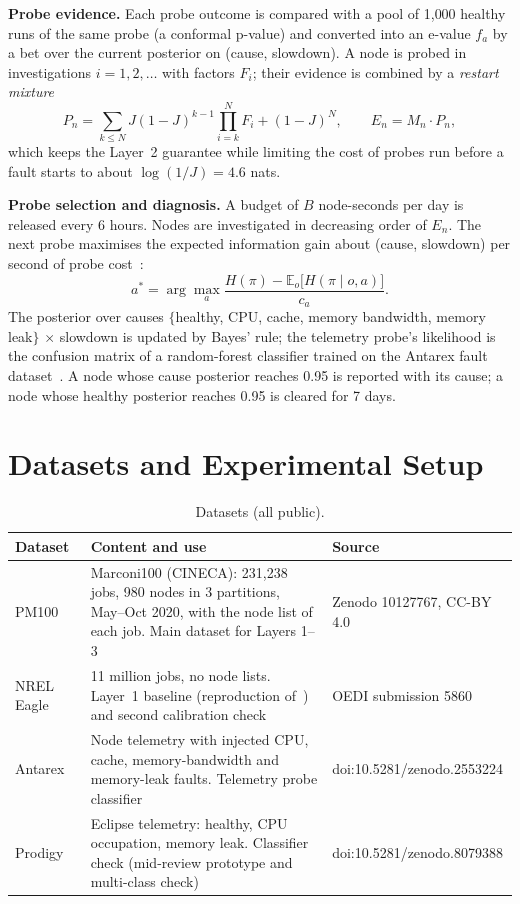 \documentclass[10pt,a4paper]{article}
\begin{document}
\textbf{Probe evidence.} Each probe outcome is compared with a pool of 1{,}000 healthy runs of the same probe (a conformal p-value) and converted into an e-value $f_a$ by a bet over the current posterior on (cause, slowdown). A node is probed in investigations $i = 1, 2, \dots$ with factors $F_i$; their evidence is combined by a \emph{restart mixture}
\begin{equation}
P_n = \sum_{k \le N} J(1-J)^{k-1}\prod_{i=k}^{N} F_i + (1-J)^N, \qquad E_n = M_n \cdot P_n,
\end{equation}
which keeps the Layer~2 guarantee while limiting the cost of probes run before a fault starts to about $\log(1/J) = 4.6$ nats.

\textbf{Probe selection and diagnosis.} A budget of $B$ node-seconds per day is released every 6 hours. Nodes are investigated in decreasing order of $E_n$. The next probe maximises the expected information gain about (cause, slowdown) per second of probe cost~\cite{rish}:
\begin{equation}
a^\ast = \arg\max_a \frac{H(\pi) - \mathbb E_{o}\bigl[H(\pi \mid o, a)\bigr]}{c_a}.
\end{equation}
The posterior over causes $\{$healthy, CPU, cache, memory bandwidth, memory leak$\}$ $\times$ slowdown is updated by Bayes' rule; the telemetry probe's likelihood is the confusion matrix of a random-forest classifier trained on the Antarex fault dataset~\cite{antarex}. A node whose cause posterior reaches 0.95 is reported with its cause; a node whose healthy posterior reaches 0.95 is cleared for 7 days.

\section{Datasets and Experimental Setup}
\begin{table}[H]
\centering
\caption{Datasets (all public).}
\label{tab:data}
\small
\begin{tabularx}{\textwidth}{@{}lXl@{}}
\toprule
Dataset & Content and use & Source \\
\midrule
PM100~\cite{pm100} & Marconi100 (CINECA): 231{,}238 jobs, 980 nodes in 3 partitions, May--Oct 2020, with the node list of each job. Main dataset for Layers 1--3 & Zenodo 10127767, CC-BY 4.0\\
NREL Eagle~\cite{eagle} & 11 million jobs, no node lists. Layer~1 baseline (reproduction of~\cite{menear}) and second calibration check & OEDI submission 5860\\
Antarex~\cite{antarex} & Node telemetry with injected CPU, cache, memory-bandwidth and memory-leak faults. Telemetry probe classifier & doi:10.5281/zenodo.2553224\\
Prodigy~\cite{prodigy} & Eclipse telemetry: healthy, CPU occupation, memory leak. Classifier check (mid-review prototype and multi-class check) & doi:10.5281/zenodo.8079388\\
\bottomrule
\end{tabularx}
\end{table}
\end{document}
